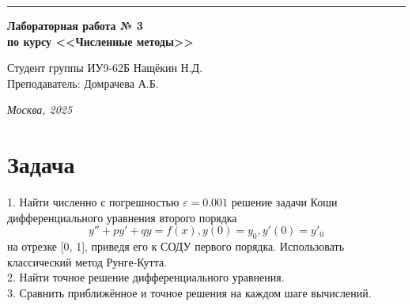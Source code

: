 \documentclass[a4paper, 14pt]{extarticle}
\begin{document}
\begin{titlepage}
\vspace*{-16pt}
\hspace{30pt}\rule{0.866\textwidth}{0.4pt}
  
\vspace{11em}

\begin{center}
\Large {\bf Лабораторная работа № 3} \\ 
\large {\bf по курсу <<Численные методы>>} \\ 
\end{center}\normalsize

\vspace{8em}


\begin{flushright}
  {Студент группы ИУ9-62Б Нащёкин Н.Д.\hspace*{15pt} \\
  \vspace{2ex}
  Преподаватель: Домрачева А.Б.\hspace*{15pt}}
\end{flushright}

\bigskip

\vfill
 

\begin{center}
\textsl{Москва, 2025}
\end{center}
\end{titlepage}

\renewcommand{\ttdefault}{pcr}

\setlength{\tabcolsep}{3pt}
\newpage
\setcounter{page}{2}

\section{Задача}
\begin{justify}
1. Найти численно с погрешностью $\varepsilon = 0.001$ решение задачи Коши дифференциального уравнения второго 
порядка 
\[
y'' + py' + qy = f(x), y(0) = y_0, y'(0) = y'_0 
\]
на отрезке [0, 1], приведя его к СОДУ первого порядка. Использовать классический метод Рунге-Кутта.\\
2. Найти точное решение дифференциального уравнения.\\
3. Сравнить приближённое и точное решения на каждом шаге вычислений.


\end{justify}
\pagebreak
\end{document}
